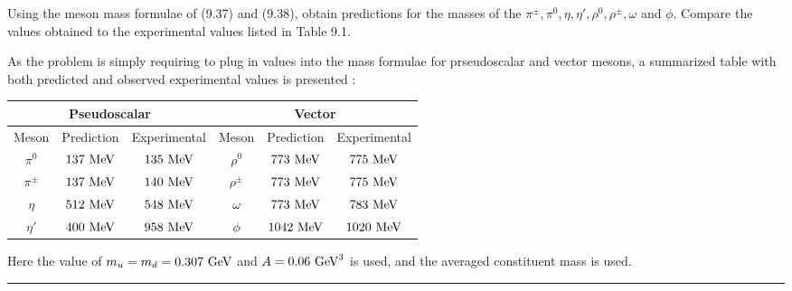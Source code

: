 
\begin{problem}{9.6}
Using the meson mass formulae of (9.37) and (9.38), obtain predictions for the masses of the $\pi^\pm , \pi^0 , \eta , \eta' , \rho^0 , \rho^\pm , \omega$ and $\phi$. Compare the values obtained to the experimental values listed in Table 9.1.
\end{problem}
\begin{solution}
    As the problem is simply requiring to plug in values into the mass formulae for prseudoscalar and vector mesons, a summarized table with both predicted and observed experimental values is presented : \\[0.125in]

    \begin{table}[tbh!]
        \centering
        \begin{tabular}{ccc|ccc}
        \multicolumn{3}{c|}{Pseudoscalar}                        & \multicolumn{3}{c}{Vector}                                \\ \hline
        \multicolumn{1}{c|}{Meson}   & Prediction & Experimental & \multicolumn{1}{c|}{Meson}    & Prediction & Experimental \\ \hline
        \multicolumn{1}{c|}{$\pi^0$}   &    $137 \text{ MeV}$  & $135 \text{ MeV}$     & \multicolumn{1}{c|}{$\rho^0$}   &  $773 \text{ MeV}$  & $775 \text{ MeV}$     \\
        \multicolumn{1}{c|}{$\pi^\pm$} &   $137 \text{ MeV}$  & $140 \text{ MeV}$     & \multicolumn{1}{c|}{$\rho^\pm$} &   $773 \text{ MeV}$  & $775 \text{ MeV}$     \\
        \multicolumn{1}{c|}{$\eta$}    &   $512 \text{ MeV}$ & $548 \text{ MeV}$     & \multicolumn{1}{c|}{$\omega$}   &   $773 \text{ MeV}$  & $783 \text{ MeV}$     \\
        \multicolumn{1}{c|}{$\eta'$}   &   $400 \text{ MeV}$  & $958 \text{ MeV}$     & \multicolumn{1}{c|}{$\phi$}     &   $1042 \text{ MeV}$   & $1020 \text{ MeV}$   
        \end{tabular}
    \end{table}\vspace{0.1in}

    Here the value of $m_u=m_d=0.307\text{ GeV}$ and $A=0.06\text{ GeV}^3$ is used, and the averaged constituent mass is used.
\end{solution}

\noindent\rule{7in}{1.5pt}


